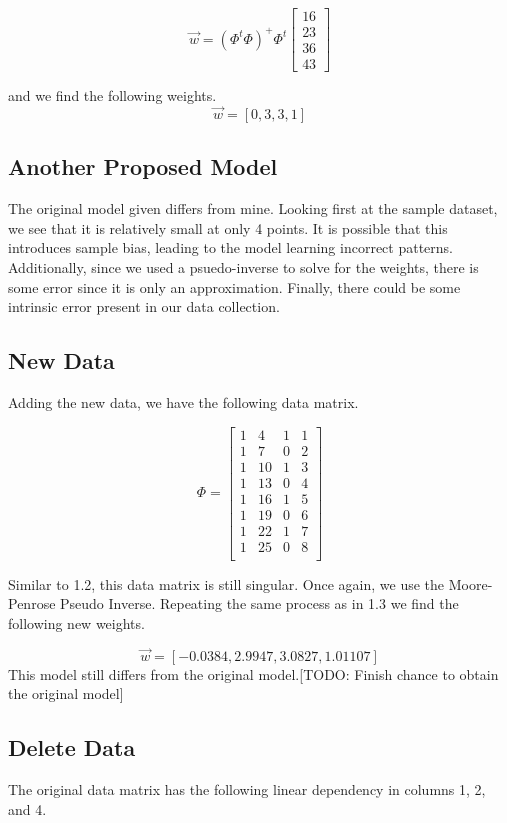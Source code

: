 \documentclass{article}
\begin{document}
\[
\Vec{w} = (\Phi^t \Phi)^+  \Phi^t 
\begin{bmatrix}
16\\
23\\
36\\
43
\end{bmatrix}
\]

\noindent
and we find the following weights.
\noindent
\[
\Vec{w} = [0, 3, 3, 1]
\]

\subsection{Another Proposed Model}

The original model given differs from mine. Looking first at the sample dataset, we see that it is relatively small at only 4 points. It is possible that this introduces sample bias, leading to the model learning incorrect patterns. Additionally, since we used a psuedo-inverse to solve for the weights, there is some error since it is only an approximation. Finally, there could be some intrinsic error present in our data collection. 

\subsection{New Data}
Adding the new data, we have the following data matrix.

\[
\Phi = \begin{bmatrix}
1 & 4 & 1 & 1\\
1 & 7 & 0 & 2\\
1 & 10 & 1 & 3\\
1 & 13 & 0 & 4\\
1 & 16 & 1 & 5\\
1 & 19 & 0 & 6\\
1 & 22 & 1 & 7\\
1 & 25 & 0 & 8\\
\end{bmatrix}
\]

\noindent
Similar to 1.2, this data matrix is still singular. Once again, we use the Moore-Penrose Pseudo Inverse. Repeating the same process as in 1.3 we find the following new weights. 

\[
\Vec{w} = [-0.0384, 2.9947, 3.0827, 1.01107]
\]
\noindent
This model still differs from the original model.[TODO: Finish chance to obtain the original model]

\subsection{Delete Data}
The original data matrix has the following linear dependency in columns 1, 2, and 4.
\end{document}
